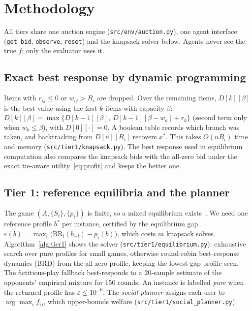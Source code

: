 \documentclass{article}
\theoremstyle{definition}
\newcommand{\BR}{\mathrm{BR}}
\begin{document}
\section{Methodology}\label{sec:method}
All tiers share one auction engine (\texttt{src/env/auction.py}), one agent interface
(\texttt{get\_bid}, \texttt{observe}, \texttt{reset}) and the knapsack solver below. Agents never see the
true $f$; only the evaluator uses it.

\subsection{Exact best response by dynamic programming}\label{sec:dp}
Items with $r_{ij}\le0$ or $w_{ij}>B_i$ are dropped. Over the remaining items, $D[k][\beta]$ is the best
value using the first $k$ items with capacity $\beta$:
$D[k][\beta]=\max\{D[k-1][\beta],\ D[k-1][\beta-w_k]+r_k\}$ (second term only when $w_k\le\beta$), with
$D[0][\cdot]=0$. A boolean table records which branch was taken, and backtracking from $D[n][B_i]$ recovers
$x^\ast$. This takes $O(nB_i)$ time and memory (\texttt{src/tier1/knapsack.py}). The best response used in
equilibrium computation also compares the knapsack bids with the all-zero bid under the exact
tie-aware utility~\eqref{eq:profit} and keeps the better one.

\subsection{Tier 1: reference equilibria and the planner}\label{sec:tier1}
The game $(A,\{S_i\},\{p_i\})$ is finite, so a mixed equilibrium exists~\citep{nash1951noncooperative}.
We need one reference profile $b^\ast$ per instance, certified by the equilibrium gap
$\varepsilon(b)=\max_i\big(\BR_i(b_{-i})-p_i(b)\big)$, which costs $m$ knapsack solves.
Algorithm~\ref{alg:tier1} shows the solver (\texttt{src/tier1/equilibrium.py}): exhaustive search over pure
profiles for small games, otherwise round-robin best-response dynamics (BRD) from the all-zero profile,
keeping the lowest-gap profile seen. The fictitious-play fallback best-responds to a $20$-sample estimate of
the opponents' empirical mixture for $150$ rounds. An instance is labelled \emph{pure} when the returned
profile has $\varepsilon\le10^{-6}$.
The \emph{social planner} assigns each user to $\arg\max_i f_{ij}$, which upper-bounds welfare
(\texttt{src/tier1/social\_planner.py}).
\end{document}
